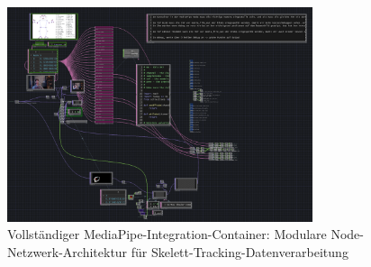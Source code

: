 \begin{figure}[htbp]
    \centering
    \includegraphics[width=0.8\textwidth,height=0.4\textheight,keepaspectratio]{images/docupictures/Finished_MediaPipeContainer.png}
    \caption{Vollständiger MediaPipe-Integration-Container: Modulare Node-Netzwerk-Architektur für Skelett-Tracking-Datenverarbeitung}
    \label{fig:mediapipe_container_komplett}
\end{figure}




